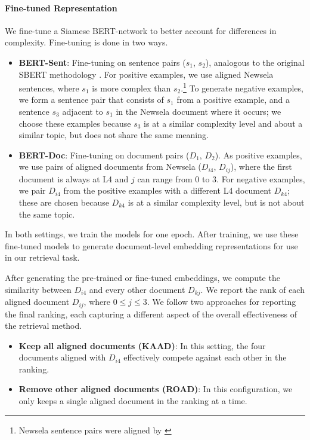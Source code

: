 \documentclass[thesis.tex]{subfiles}
\begin{document}
\paragraph {\bf Fine-tuned Representation} We fine-tune a Siamese BERT-network to better account for differences in complexity. Fine-tuning is done in two ways.

\begin{itemize}
    \item \textbf{BERT-Sent}: Fine-tuning on sentence pairs ($s_1$, $s_2$), analogous to the original SBERT methodology \citep{reimers2019sentence}.  For positive examples, we use aligned Newsela sentences, where $s_1$ is more complex than $s_2$.\footnote{Newsela sentence pairs were aligned by \cite{jiang2020neural}} To generate negative examples, we form a sentence pair that consists of $s_1$ from a  positive example, and a sentence $s_3$ adjacent to $s_1$ in the Newsela document where it occurs; we choose these examples because $s_3$ is at a similar complexity level and about a similar topic, but does not share the same meaning.

    \item \textbf{BERT-Doc}: Fine-tuning on document pairs ($D_1$, $D_2$). As positive examples, we use pairs of aligned documents from Newsela ($D_{i4}$, $D_{ij}$), where the first document is always at L4 and $j$ can range from 0 to 3. For negative examples, we pair $D_{i4}$ from the positive examples with a different L4 document $D_{k4}$; these are chosen because $D_{k4}$ is at a similar complexity level, but is not about the same topic.
\end{itemize}

In both settings, we train the models for one epoch. After training, we use these fine-tuned models to generate document-level embedding representations for use in our retrieval task.

After generating the pre-trained or fine-tuned embeddings, we compute the similarity between $D_{i4}$ and every other document $D_{kj}$. We report the rank of each aligned document $D_{ij}$, where $0 \leq j \leq 3$. We follow two approaches for reporting the final ranking, each capturing a different aspect of the overall effectiveness of the retrieval method.

\begin{itemize}
    \item \textbf{Keep all aligned documents (KAAD)}: In this setting, the four documents aligned with $D_{i4}$ effectively compete against each other in the ranking. 
    \item \textbf{Remove other aligned documents (ROAD)}: In this configuration, we only keeps a single aligned document in the ranking at a time.
\end{itemize}
\end{document}
